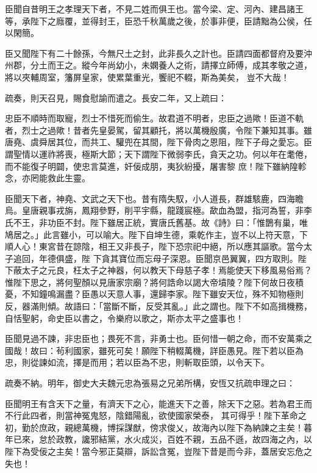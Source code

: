 \begin{pinyinscope}
 臣聞自昔明王之孝理天下者，不見二姓而俱王也。當今梁、定、河內、建昌諸王等，承陛下之廕覆，並得封王，臣恐千秋萬歲之後，於事非便，臣請黜為公侯，任以閑簡。



 臣又聞陛下有二十餘孫，今無尺土之封，此非長久之計也。臣請四面都督府及要沖州郡，分土而王之。縱今年尚幼小，未嫻養人之術，請擇立師傅，成其孝敬之道，將以夾輔周室，籓屏皇家，使累葉重光，饗祀不輟，斯為美矣，
 豈不大哉！



 疏奏，則天召見，賜食慰諭而遣之。長安二年，又上疏曰：



 忠臣不順時而取寵，烈士不惜死而偷生。故君道不明者，忠臣之過歟！臣道不軌者，烈士之過歟！昔者先皇晏駕，留其顧托，將以萬機殷廣，令陛下兼知其事。雖唐堯、虞舜居其位，而共工、驩兜在其間，陛下骨肉之恩阻，陛下子母之愛忘。臣謂聖情以運祚將喪，極斯大節；天下謂陛下微弱李氏，貪天之功。何以年在耄倦，而不能復子明闢，使忠言莫進，奸佞成朋，夷狄紛擾，屠害黎
 庶！陛下雖納隍軫念，亦罔能救此生靈。



 臣聞天下者，神堯、文武之天下也。昔有隋失馭，小人道長，群雄駭鹿，四海瞻烏。皇唐親事戎旃，鳳翔參野，削平宇縣，龍踐宸極。歃血為盟，指河為誓，非李氏不王，非功臣不封。陛下雖居正統，實唐氏舊基。故《詩》曰：「惟鵲有巢，唯鳩居之。」此言雖小，可以喻大。陛下自坤生德，乘乾作主，豈不以上符天意，下順人心！東宮昔在諒陰，相王又非長子，陛下恐宗祀中絕，所以應其謳歌。當今太子追回，年德俱盛，陛
 下貪其寶位而忘母子深恩。臣聞京邑翼翼，四方取則。陛下蔽太子之元良，枉太子之神器，何以教天下母慈子孝！焉能使天下移風易俗焉？惟陛下思之，將何聖顏以見唐家宗廟？將何誥命以謁大帝墳陵？陛下何故日夜積憂，不知鐘鳴漏盡？臣愚以天意人事，還歸李家。陛下雖安天位，殊不知物極則反，器滿則傾。故語曰：「當斷不斷，反受其亂。」此之謂也。陛下不如高揖機務，自恬聖躬，命史臣以書之，令樂府以歌之，斯亦太平之盛事也！



 臣聞見過不諫，非忠臣也；畏死不言，非勇士也。臣何惜一朝之命，而不安萬乘之國哉！故曰：茍利國家，雖死可矣！願陛下稍輟萬機，詳臣愚見。陛下若以臣為忠，則從諫如流，擇是而用；若以臣為不忠，則斬取臣頭，以令天下。



 疏奏不納。明年，御史大夫魏元忠為張易之兄弟所構，安恆又抗疏申理之曰：



 臣聞明王有含天下之量，有濟天下之心，能進天下之善，除天下之惡。若為君王而不行此四者，則當神冤鬼怒，陰錯陽亂，欲使國家榮泰，
 其可得乎！陛下革命之初，勤於庶政，親總萬機，博採謀猷，傍求俊乂，故海內以陛下為納諫之主矣！暮年已來，怠於政教，讒邪結黨，水火成災，百姓不親，五品不遜，故四海之內，以陛下為受佞之主矣！當今邪正莫辯，訴訟含冤，豈陛下昔是而今非，蓋居安忘危之失也！




\end{pinyinscope}
